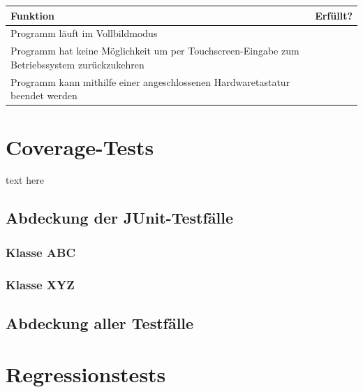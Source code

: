 \documentclass{article}
\newcommand{\cmark}{\ding{51}}
\begin{document}
    \begin{table}[H]
      \begin{tabularx}{\textwidth}{| >{\raggedright\arraybackslash}X | c |}
        \hline
        \textbf{Funktion} & \textbf{Erfüllt?} \\
        \hline
        Programm läuft im Vollbildmodus & \cmark \\
        \hline
        Programm hat keine Möglichkeit um per Touchscreen-Eingabe zum Betriebssystem zurückzukehren & \cmark \\
        \hline
        Programm kann mithilfe einer angeschlossenen Hardwaretastatur beendet werden & \cmark \\
        \hline
      \end{tabularx}
    \end{table}

\section{Coverage-Tests}
text here
  \subsection{Abdeckung der JUnit-Testfälle}
    \subsubsection{Klasse ABC}
    \subsubsection{Klasse XYZ}
  \subsection{Abdeckung aller Testfälle}

\section{Regressionstests}
\end{document}
